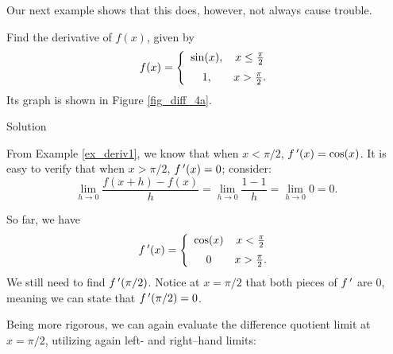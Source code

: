 \ifcourse
Our next example shows that this does, however, not always cause trouble.
\ifanalysis\pagebreak\fi

\begin{example}\label{ex_diff_piecewise}
Find the derivative of $f(x)$, given by 
$$\displaystyle f(x) = \left\{\begin{array}{cc} \sin(x), & x\leq \frac{\pi}{2} \\[0.2cm] 1, & x>\frac{\pi}{2}. \end{array}\right.$$
Its graph is shown in Figure \ref{fig_diff_4a}.

Solution 

From Example \ref{ex_deriv1}, we know that when $x<\pi/2$, $f\,'(x) = \cos (x)$. It is easy to verify that when $x>\pi/2$, $f\,'(x) = 0$; consider:
			$$\lim_{h\to0}\frac{f(x+h) - f(x)}{h} = \lim_{h\to0}\frac{1-1}{h} = \lim_{h\to0}0 =0.$$

			
So far, we have $$f\,'(x) = \left\{\begin{array}{cc} \cos(x) & x<\frac{\pi}{2}\\[0.2cm] 0 & x>\frac{\pi}{2}.\end{array}\right.$$ We still need to find $f\,'(\pi/2)$. Notice at $x=\pi/2$ that both pieces of $f\,'$ are 0, meaning we can state that $f\,'(\pi/2)=0$. 

Being more rigorous, we can again evaluate the difference quotient limit at $x=\pi/2$, utilizing again left- and right--hand limits:\\



\end{example}
